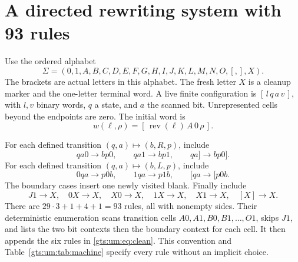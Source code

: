 \documentclass[11pt,letterpaper]{article}
\theoremstyle{definition}
\theoremstyle{remark}
\newcommand{\rev}{\operatorname{rev}}
\newcommand{\hto}{\mathrel{\longrightarrow}}
\begin{document}
\section{A directed rewriting system with 93 rules}
\label{gts:um:sec:rewriting}
Use the ordered alphabet
\[
 \Sigma=(0,1,A,B,C,D,E,F,G,H,I,J,K,L,M,N,O,[,],X).
\]
The brackets are actual letters in this alphabet. The fresh letter $X$ is a cleanup marker and the one-letter terminal word. A live finite configuration is $[\,l\,q\,a\,v\,]$, with $l,v$ binary words, $q$ a state, and $a$ the scanned bit. Unrepresented cells beyond the endpoints are zero. The initial word is
\begin{equation}\label{gts:um:eq:initial}
 w(\ell,\rho)=[\,\rev(\ell)\,A\,0\,\rho\,].
\end{equation}

For each defined transition $(q,a)\mapsto(b,R,p)$, include
\begin{equation}\label{gts:um:eq:Rrules}
 qa0\hto bp0,\qquad qa1\hto bp1,\qquad qa]\hto bp0].
\end{equation}
For each defined transition $(q,a)\mapsto(b,L,p)$, include
\begin{equation}\label{gts:um:eq:Lrules}
 0qa\hto p0b,\qquad 1qa\hto p1b,\qquad [qa\hto[p0b.
\end{equation}
The boundary cases insert one newly visited blank. Finally include
\begin{equation}\label{gts:um:eq:clean}
 J1\hto X,\quad 0X\hto X,\quad X0\hto X,\quad
 1X\hto X,\quad X1\hto X,\quad [X]\hto X.
\end{equation}
There are $29\cdot3+1+4+1=93$ rules, all with nonempty sides. Their deterministic enumeration scans transition cells $A0,A1,B0,B1,\ldots,O1$, skips $J1$, and lists the two bit contexts then the boundary context for each cell. It then appends the six rules in \eqref{gts:um:eq:clean}. This convention and Table~\ref{gts:um:tab:machine} specify every rule without an implicit choice.
\end{document}
